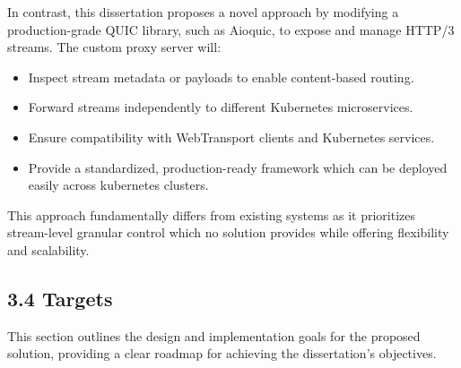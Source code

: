 In contrast, this dissertation proposes a novel approach by modifying a production-grade QUIC library, such as Aioquic, to expose and manage HTTP/3 streams. The custom proxy server will:

\begin{itemize}
    \item Inspect stream metadata or payloads to enable content-based routing.
    \item Forward streams independently to different Kubernetes microservices.
    \item Ensure compatibility with WebTransport clients and Kubernetes services.
    \item Provide a standardized, production-ready framework which can be deployed easily across kubernetes clusters.
\end{itemize}
This approach fundamentally differs from existing systems as it prioritizes stream-level granular control which no solution provides while offering flexibility and scalability.

\subsection*{3.4 Targets}
This section outlines the design and implementation goals for the proposed solution, providing a clear roadmap for achieving the dissertation’s objectives.

